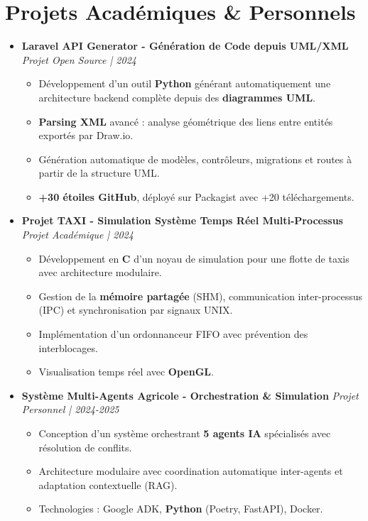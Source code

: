 \documentclass[a4paper,11pt]{article}
\begin{document}
\section{Projets Académiques \& Personnels}
\begin{itemize}[leftmargin=*, label={-}]

\item \textbf{Laravel API Generator - Génération de Code depuis UML/XML} \hfill \textit{Projet Open Source | 2024}
\vspace{-2pt}
\begin{itemize}[leftmargin=0.4cm, nosep, label=\tiny$\bullet$]
    \item \small{Développement d'un outil \textbf{Python} générant automatiquement une architecture backend complète depuis des \textbf{diagrammes UML}.}
    \item \small{\textbf{Parsing XML} avancé : analyse géométrique des liens entre entités exportés par Draw.io.}
    \item \small{Génération automatique de modèles, contrôleurs, migrations et routes à partir de la structure UML.}
    \item \small{\textbf{+30 étoiles GitHub}, déployé sur Packagist avec +20 téléchargements.}
\end{itemize}
\vspace{3pt}

\item \textbf{Projet TAXI - Simulation Système Temps Réel Multi-Processus} \hfill \textit{Projet Académique | 2024}
\vspace{-2pt}
\begin{itemize}[leftmargin=0.4cm, nosep, label=\tiny$\bullet$]
    \item \small{Développement en \textbf{C} d'un noyau de simulation pour une flotte de taxis avec architecture modulaire.}
    \item \small{Gestion de la \textbf{mémoire partagée} (SHM), communication inter-processus (IPC) et synchronisation par signaux UNIX.}
    \item \small{Implémentation d'un ordonnanceur FIFO avec prévention des interblocages.}
    \item \small{Visualisation temps réel avec \textbf{OpenGL}.}
\end{itemize}
\vspace{3pt}

\item \textbf{Système Multi-Agents Agricole - Orchestration \& Simulation} \hfill \textit{Projet Personnel | 2024-2025}
\vspace{-2pt}
\begin{itemize}[leftmargin=0.4cm, nosep, label=\tiny$\bullet$]
    \item \small{Conception d'un système orchestrant \textbf{5 agents IA} spécialisés avec résolution de conflits.}
    \item \small{Architecture modulaire avec coordination automatique inter-agents et adaptation contextuelle (RAG).}
    \item \small{Technologies : Google ADK, \textbf{Python} (Poetry, FastAPI), Docker.}
\end{itemize}
\vspace{3pt}


\end{itemize}
\end{document}

